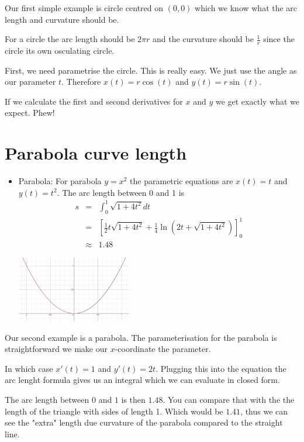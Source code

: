 \documentclass[]{article} %
\theoremstyle{definition}
\theoremstyle{theorem}
\begin{document}
Our first simple example is circle centred on $(0,0)$ which we know what the arc length and curvature should be.

For a circle the arc length should be $2 \pi r$ and the curvature should be $\frac{1}{r}$ since the circle its own osculating circle.

First, we need parametrise the circle. This is really easy. We just use the angle as our parameter $t$. Therefore $x(t)=r \cos(t)$ and $y(t)= r \sin(t)$.

If we calculate the first and second derivatives for $x$ and $y$ we get exactly what we expect. Phew!

\section{Parabola curve length}
\begin{tcolorbox}
	\begin{itemize}			
		\item Parabola: For parabola $y=x^2$ the parametric equations are $x(t)=t$ and $y(t)=t^2$. The arc length between 0 and 1 is 
		\begin{eqnarray*}
			s &=& \int_{0}^{1} \sqrt{1+4t^2}dt \\ &=& \left[\frac{1}{2} t\sqrt{1+ 4 t^2} +\frac{1}{4} \ln \left(2 t+\sqrt{1+ 4 t^2} \right) \right]_{0}^1 \\
			&\approx&	 1.48
		\end{eqnarray*}
	\begin{minipage}{\linewidth}
		\centering
		\includegraphics[width=50mm, scale=0.4]{Parabola_Arc_Length.png}
	\end{minipage}
	\end{itemize}
\end{tcolorbox}

Our second example is a parabola. The parameterisation for the parabola is straightforward we make our $x$-coordinate the parameter. 

In which case $x'(t)=1$ and $y'(t)=2 t$. Plugging this into the equation the arc lenght formula gives us an integral which we can evaluate in closed form.

The arc length between $0$ and $1$ is then $1.48$. You can compare that with the the length of the triangle with sides of length 1. Which would be $1.41$, thus we can see the "extra" length due curvature of the parabola compared to the straight line.
\end{document}
